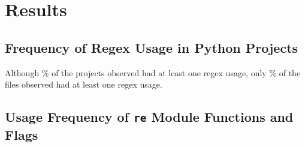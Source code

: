 \section{Results}
\label{sec:results}
\subsection{Frequency of Regex Usage in Python Projects}

Although \% of the projects observed had at least one regex usage, only \% of the files observed had at least one regex usage. 



\subsection{Usage Frequency of {\tt re} Module Functions and Flags}






